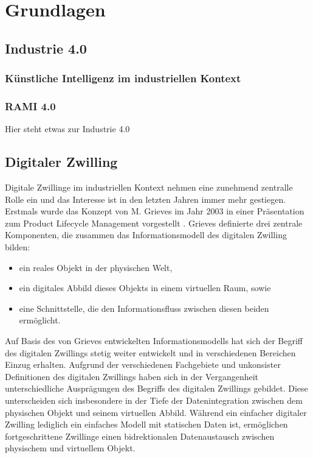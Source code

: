 \section{Grundlagen}
\subsection{Industrie 4.0}
\subsubsection{Künstliche Intelligenz im industriellen Kontext}
\subsubsection{RAMI 4.0}
Hier steht etwas zur Industrie 4.0



\subsection{Digitaler Zwilling}
Digitale Zwillinge im industriellen Kontext nehmen eine zunehmend zentralle Rolle ein und das Interesse ist in den letzten Jahren immer mehr gestiegen.
Erstmals wurde das Konzept von M. Grieves im Jahr 2003 in einer Präsentation zum Product Lifecycle Management vorgestellt \cite{DTGrieves}. 
Grieves definierte drei zentrale Komponenten, die zusammen das Informationsmodell des digitalen Zwilling bilden:
\begin{itemize}
    \item ein reales Objekt in der physischen Welt,
    \item ein digitales Abbild dieses Objekts in einem virtuellen Raum, sowie
    \item eine Schnittstelle, die den Informationsfluss zwischen diesen beiden ermöglicht.
\end{itemize}

Auf Basis des von Grieves entwickelten Informationsmodells hat sich der Begriff des digitalen Zwillings stetig weiter entwickelt und in verschiedenen Bereichen Einzug erhalten. 
Aufgrund der verschiedenen Fachgebiete und unkonsister Definitionen des digitalen Zwillings haben sich in der Vergangenheit unterschiedliche Ausprägungen des Begriffs des digitalen Zwillings gebildet.
Diese unterscheiden sich insbesondere in der Tiefe der Datenintegration zwischen dem physischen Objekt und seinem virtuellen Abbild.
Während ein einfacher digitaler Zwilling lediglich ein einfaches Modell mit statischen Daten ist, ermöglichen fortgeschrittene Zwillinge einen bidrektionalen Datenaustausch zwischen physischem und virtuellem Objekt. 


